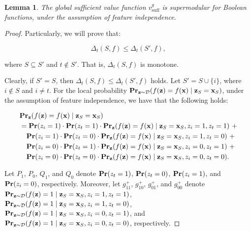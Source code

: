 \documentclass{article}
\newtheorem{lemma}{Lemma}
\newcommand{\z}{\textbf{z}}
\newcommand{\x}{\textbf{x}}
\newcommand{\mbf}[1]{\ensuremath\mathbf{#1}}
\begin{document}
\begin{lemma} \label{lem:bfid}
The global sufficient value function $v^g_{\text{suff}}$
is supermodular for Boolean functions, under the assumption of feature independence.
\end{lemma}


\begin{proof}
Particularly, we will prove that:

\begin{equation}
\Delta_{t}(S,f) \le \Delta_{t}(S',f),
\end{equation}

where $S\subseteq S'$ and $t \not\in S'$. That is, $\Delta_{t}(S,f)$ is monotone.

Clearly, if $S' = S$, then $\Delta_{t}(S,f) \le \Delta_{t}(S',f)$ holds.
Let $S' = S\cup\{i\}$, where $i\not\in S$ and $i \neq t$.
For the local probability $\mbf{Pr}_{\z\sim \mathcal{D}}(f(\z) = f(\x) \mid \z_{S} = \x_{S})$,
under the assumption of feature independence, we have that the following holds:

\begin{equation}
\begin{aligned}
&\mbf{Pr}_{\z}(f(\z) = f(\x) \mid \z_{S} = \x_{S}) \\
&= \mbf{Pr}(z_i = 1) \cdot \mbf{Pr}(z_t = 1) \cdot \mbf{Pr}_{\z}(f(\z) = f(\x) \mid \z_{S} = \x_{S}, z_i = 1, z_t = 1) \ + \\
&\hspace{1em} \mbf{Pr}(z_i = 1) \cdot \mbf{Pr}(z_t = 0) \cdot \mbf{Pr}_{\z}(f(\z) = f(\x) \mid \z_{S} = \x_{S}, z_i = 1, z_t = 0) \ + \\
&\hspace{1em} \mbf{Pr}(z_i = 0) \cdot \mbf{Pr}(z_t = 1) \cdot \mbf{Pr}_{\z}(f(\z) = f(\x) \mid \z_{S} = \x_{S}, z_i = 0, z_t = 1) \ + \\
&\hspace{1em} \mbf{Pr}(z_i = 0) \cdot \mbf{Pr}(z_t = 0) \cdot \mbf{Pr}_{\z}(f(\z) = f(\x) \mid \z_{S} = \x_{S}, z_i = 0, z_t = 0).
\end{aligned}
\end{equation}


Let $P_{1}$, $P_{0}$, $Q_{1}$, and $Q_{0}$ denote $\mbf{Pr}(z_t = 1)$, $\mbf{Pr}(z_t = 0)$, $\mbf{Pr}(z_i = 1)$, and $\mbf{Pr}(z_i = 0)$, respectively.
Moreover, let $g_{11}^{+}$, $g_{10}^{+}$, $g_{01}^{+}$, and $g_{00}^{+}$ denote
$\mbf{Pr}_{\z \sim \mathcal{D}}(f(\z) = 1 \mid \z_{S} = \x_{S}, z_i = 1, z_t = 1)$, 
$\mbf{Pr}_{\z \sim \mathcal{D}}(f(\z) = 1 \mid \z_{S} = \x_{S}, z_i = 1, z_t = 0)$,
$\mbf{Pr}_{\z \sim \mathcal{D}}(f(\z) = 1 \mid \z_{S} = \x_{S}, z_i = 0, z_t = 1)$, and 
$\mbf{Pr}_{\z \sim \mathcal{D}}(f(\z) = 1 \mid \z_{S} = \x_{S}, z_i = 0, z_t = 0)$, respectively.


\end{proof}
\end{document}
